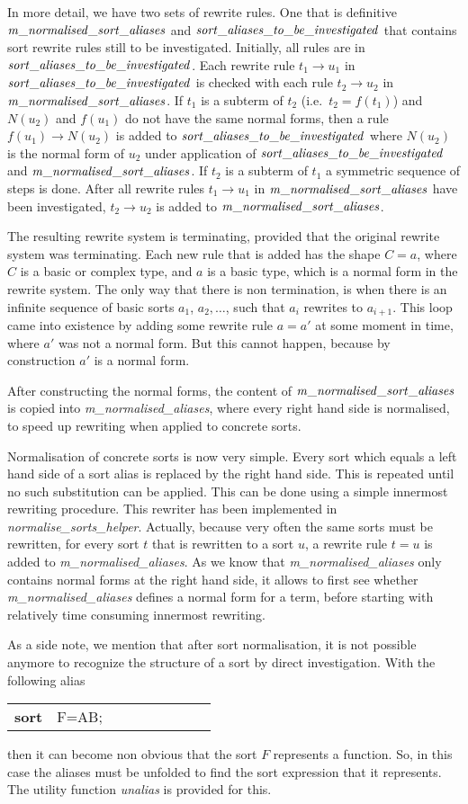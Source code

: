 \documentclass{article}
\makeatletter
\newenvironment{mcrl2}%
{\begin{trivlist}
\item\begin{tabular}{@{}>{\bf}p{2.3em}L@{\ }L@{\ }L@{\ }L@{\ }L@{\ }L@{\ }L@{\ }L}}%
{\end{tabular}\end{trivlist}}
\makeatother
\begin{document}
In more detail, we have two sets of rewrite rules. One that is definitive
${\it m\_normalised\_sort\_aliases}$ and $\it sort\_aliases\_to\_be\_investigated$ 
that contains sort rewrite rules
still to be investigated. Initially, all rules are in 
$\it sort\_aliases\_to\_be\_investigated$. Each rewrite rule $t_1\rightarrow u_1$
in $\it sort\_aliases\_to\_be\_investigated$ is checked with
each rule $t_2\rightarrow u_2$ in ${\it m\_normalised\_sort\_aliases}$.
If $t_1$ is a subterm of $t_2$ (i.e.\ $t_2=f(t_1)$) and 
$N(u_2)$ and $f(u_1)$ do not have the same normal forms, then a rule $f(u_1)\rightarrow
N(u_2)$ is added to $\it sort\_aliases\_to\_be\_investigated$ where $N(u_2)$ is
the normal form of $u_2$ under application of $\it sort\_aliases\_to\_be\_investigated$ and
${\it m\_normalised\_sort\_aliases}$.
If $t_2$ is a subterm of $t_1$ a symmetric sequence of steps is done.
After all rewrite rules $t_1\rightarrow u_1$ in ${\it m\_normalised\_sort\_aliases}$
have been investigated, $t_2\rightarrow u_2$ is added to 
${\it m\_normalised\_sort\_aliases}$.

The resulting rewrite system is terminating, provided that the original rewrite system
was terminating. Each new rule that is added has the shape $C = a$, where $C$ is
a basic or complex type, and $a$ is a basic type, which is a normal form in the
rewrite system. The only way that there is non termination, is when there
is an infinite sequence of basic sorts $a_1$, $a_2,\ldots$, such that $a_i$ rewrites
to $a_{i+1}$. This loop came into existence by adding some rewrite rule $a=a'$ at
some moment in time, where $a'$ was not a normal form. But this cannot happen,
because by construction $a'$ is a normal form.

After constructing the normal forms, the content of ${\it m\_normalised\_sort\_aliases}$
is copied into {\it m\_normalised\_aliases}, where every right hand side is normalised,
to speed up rewriting when applied to concrete sorts.

Normalisation of concrete sorts is now very simple. Every sort which equals a
left hand side of a sort alias is replaced by the right hand side. This is repeated
until no such substitution can be applied. This can be done using a simple 
innermost rewriting procedure. This rewriter has been implemented in 
{\it normalise\_sorts\_helper}. Actually, because very often the same sorts must
be rewritten, for every sort $t$ that is rewritten to a sort $u$, a rewrite
rule $t=u$  is added to {\it m\_normalised\_aliases}. As we know that {\it m\_normalised\_aliases}
only contains normal forms at the right hand side, it allows to first see
whether {\it m\_normalised\_aliases} defines a normal form for a term, before starting
with relatively time consuming innermost rewriting.

As a side note, we mention that after sort normalisation, it is not possible
anymore to recognize the structure of a sort by direct investigation. With the following
alias
\begin{mcrl2}
sort&F=A\rightarrow B;
\end{mcrl2}
then it can become non obvious that the sort $F$ represents a function. 
So, in this case the aliases must be unfolded to find the sort expression
that it represents. The utility function {\it unalias} is provided for this.
\end{document}
